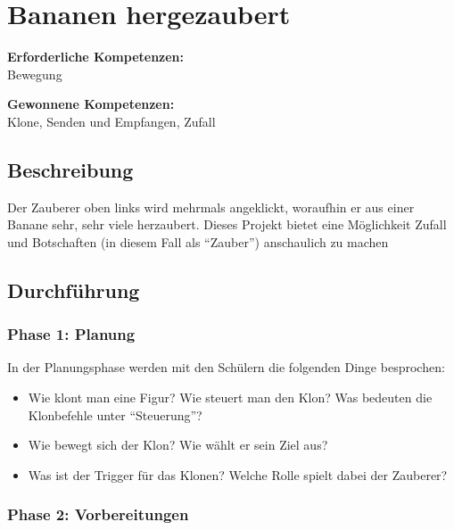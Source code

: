 \section{Bananen hergezaubert}\label{bananen-hergezaubert}

\textbf{Erforderliche Kompetenzen:}\\
Bewegung

\textbf{Gewonnene Kompetenzen:}\\
Klone, Senden und Empfangen, Zufall

\begin{figure}[ht]
    \centering 
    \caption[\Sectionname]{\Sectionname}
\end{figure}

\subsection{Beschreibung}\label{beschreibung}

Der Zauberer oben links wird mehrmals angeklickt, woraufhin er aus einer
Banane sehr, sehr viele herzaubert. Dieses Projekt bietet eine
Möglichkeit Zufall und Botschaften (in diesem Fall als ``Zauber'')
anschaulich zu machen

\subsection{Durchführung}\label{durchfuxfchrung}

\subsubsection{Phase 1: Planung}\label{phase-1-planung}

In der Planungsphase werden mit den Schülern die folgenden Dinge
besprochen:

\begin{itemize}
\item
  Wie klont man eine Figur? Wie steuert man den Klon? Was bedeuten die
  Klonbefehle unter ``Steuerung''?
\item
  Wie bewegt sich der Klon? Wie wählt er sein Ziel aus?
\item
  Was ist der Trigger für das Klonen? Welche Rolle spielt dabei der
  Zauberer?
\end{itemize}

\subsubsection{Phase 2: Vorbereitungen}\label{phase-2-vorbereitungen}

